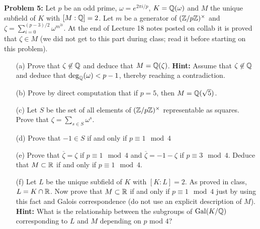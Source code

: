\documentclass[12pt]{amsart}
\begin{document}
\skv
{\bf Problem 5:} Let $p$ be an odd prime, $\omega=e^{2\pi i/p}$, $K={\mathbb Q}(\omega)$
and $M$ the unique subfield of $K$ with $[M:{\mathbb Q}]=2$. Let $m$ be a generator of $({\mathbb Z}/p{\mathbb Z})^{\times}$
and $\zeta=\sum_{i=0}^{(p-3)/2} \omega^{m^{2i}}$.
At the end of Lecture 18 notes posted on collab it is proved
that $\zeta\in M$ (we did not get to this part during class; read it before starting on this problem).
\begin{itemize}
\item[(a)] Prove that $\zeta\not\in{\mathbb Q}$ and deduce that
$M={\mathbb Q}(\zeta)$. {\bf Hint:} Assume that $\zeta\not\in{\mathbb Q}$ and deduce that $\deg_{{\mathbb Q}}(\omega)<p-1$, thereby
reaching a contradiction.
\item[(b)] Prove by direct computation that if $p=5$, then $M={\mathbb Q}(\sqrt{5})$.
\item[(c)] Let $S$ be the set of all elements of $({\mathbb Z}/p{\mathbb Z})^{\times}$ representable 
as squares. Prove that $\zeta=\sum_{s\in S}\omega^s$.
\item[(d)] Prove that $-1\in S$ if and only if $p\equiv 1\mod 4$
\item[(e)] Prove that $\overline\zeta=\zeta$ if $p\equiv 1\mod 4$ and $\overline\zeta=-1-\zeta$
if $p\equiv 3\mod 4$. Deduce that $M\subset {\mathbb R}$ if and only if $p\equiv 1\mod 4$.
\item[(f)] Let $L$ be the unique subfield of $K$ with $[K:L]=2$. As proved in class,
$L=K\cap {\mathbb R}$. Now prove that $M\subset {\mathbb R}$ if and only if $p\equiv 1\mod 4$ just 
by using this fact and Galois correspondence (do not use an explicit description of $M$).
{\bf Hint:} What is the relationship between the subgroups of ${\rm Gal}(K/{\mathbb Q})$ corresponding
to $L$ and $M$ depending on $p$ mod $4$?
\end{itemize} 
\end{document}
